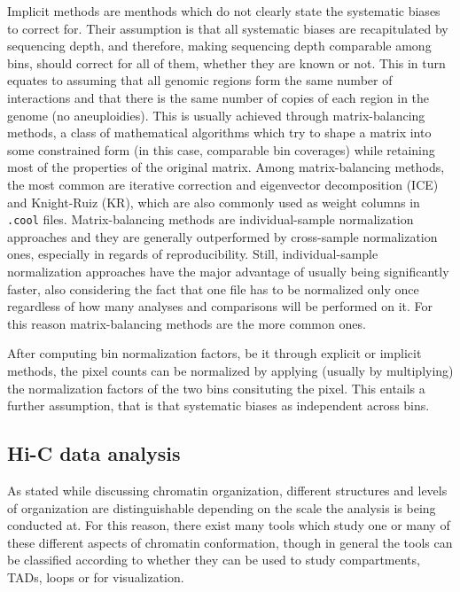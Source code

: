 Implicit methods are menthods which do not clearly state the systematic biases to correct for. Their assumption is that all systematic biases are recapitulated by sequencing depth, and therefore, making sequencing depth comparable among bins, should correct for all of them, whether they are known or not. This in turn equates to assuming that all genomic regions form the same number of interactions and that there is the same number of copies of each region in the genome (no aneuploidies). This is usually achieved through matrix-balancing methods, a class of mathematical algorithms which try to shape a matrix into some constrained form (in this case, comparable bin coverages) while retaining most of the properties of the original matrix. Among matrix-balancing methods, the most common are iterative correction and eigenvector decomposition (ICE)\cite{ice2012} and Knight-Ruiz (KR)\cite{knightruiz2012}, which are also commonly used as weight columns in \texttt{.cool} files. Matrix-balancing methods are individual-sample normalization approaches and they are generally outperformed by cross-sample normalization ones, especially in regards of reproducibility. Still, individual-sample normalization approaches have the major advantage of usually being significantly faster, also considering the fact that one file has to be normalized only once regardless of how many analyses and comparisons will be performed on it. For this reason matrix-balancing methods are the more common ones.

After computing bin normalization factors, be it through explicit or implicit methods, the pixel counts can be normalized by applying (usually by multiplying) the normalization factors of the two bins consituting the pixel. This entails a further assumption, that is that systematic biases as independent across bins.

\subsection{Hi-C data analysis}

As stated while discussing chromatin organization, different structures and levels of organization are distinguishable depending on the scale the analysis is being conducted at. For this reason, there exist many tools which study one or many of these different aspects of chromatin conformation, though in general the tools can be classified according to whether they can be used to study compartments, TADs, loops or for visualization\cite{hicprocessing2018}.

